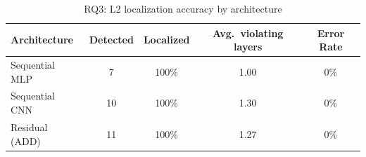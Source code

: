 \begin{table}[t]
\centering
\caption{RQ3: L2 localization accuracy by architecture}
\label{tab:rq3-loc}
\small
\begin{tabular}{lcccc}
\toprule
\textbf{Architecture} & \textbf{Detected} & \textbf{Localized} & \textbf{Avg.\ violating layers} & \textbf{Error Rate} \\
\midrule
Sequential MLP & 7 & 100\% & 1.00 & 0\% \\
Sequential CNN & 10 & 100\% & 1.30 & 0\% \\
Residual (ADD) & 11 & 100\% & 1.27 & 0\% \\
\bottomrule
\end{tabular}
\end{table}